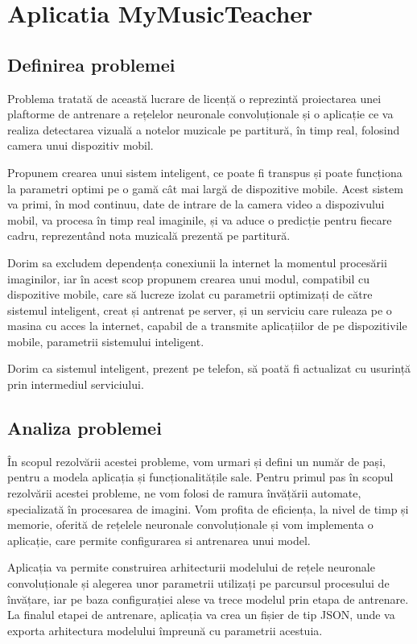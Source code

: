
\chapter{Aplicatia MyMusicTeacher}

\section{Definirea problemei}
	Problema tratată de această lucrare de licență o reprezintă proiectarea unei plaftorme de antrenare a rețelelor neuronale convoluționale și o aplicație ce va realiza detectarea vizuală a notelor muzicale pe partitură, în timp real, folosind camera unui dispozitiv mobil. 
	
	Propunem crearea unui sistem inteligent, ce poate fi transpus și poate funcționa la parametri optimi pe o gamă cât mai largă de dispozitive mobile. Acest sistem va primi, în mod continuu, date de intrare de la camera video a dispozivului mobil, va procesa în timp real imaginile, și va aduce o predicție pentru fiecare cadru, reprezentând nota muzicală prezentă pe partitură. 
	
	Dorim sa excludem dependența conexiunii la internet la momentul procesării imaginilor, iar în acest scop propunem crearea unui modul, compatibil cu dispozitive mobile, care să lucreze izolat cu parametrii optimizați de către sistemul inteligent, creat și antrenat pe server, și un serviciu care ruleaza pe o masina cu acces la internet, capabil de a transmite aplicațiilor de pe dispozitivile mobile, parametrii sistemului inteligent. 
	
	Dorim ca sistemul inteligent, prezent pe telefon, să poată fi actualizat cu usurință prin intermediul serviciului.  

\section{Analiza problemei}
	În scopul rezolvării acestei probleme, vom urmari și defini un număr de pași, pentru a modela aplicația și funcționalitățile sale.
	Pentru primul pas în scopul rezolvării acestei probleme, ne vom folosi de ramura învățării automate, specializată în procesarea de imagini. Vom profita de eficiența, la nivel de timp și memorie, oferită de rețelele neuronale convoluționale și vom implementa o aplicație, care permite configurarea si antrenarea unui model.
	
	Aplicația va permite construirea arhitecturii modelului de rețele neuronale convoluționale și alegerea unor parametrii utilizați pe parcursul procesului de învățare, iar pe baza configurației alese va trece modelul prin etapa de antrenare. La finalul  etapei de antrenare, aplicația va crea un fișier de tip JSON, unde va exporta arhitectura modelului împreună cu parametrii acestuia. 
	
